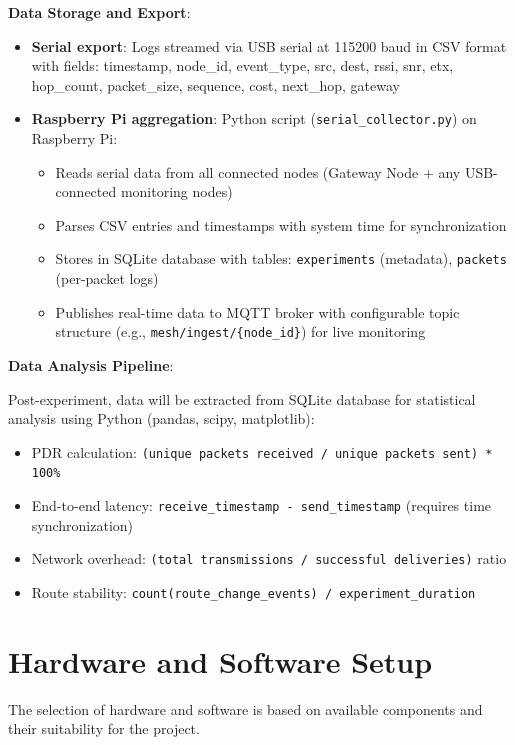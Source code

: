 \textbf{Data Storage and Export}:

\begin{itemize}
\item \textbf{Serial export}: Logs streamed via USB serial at 115200 baud in CSV format with fields: timestamp, node\_id, event\_type, src, dest, rssi, snr, etx, hop\_count, packet\_size, sequence, cost, next\_hop, gateway

\item \textbf{Raspberry Pi aggregation}: Python script (\texttt{serial\_collector.py}) on Raspberry Pi:
\begin{itemize}
\item Reads serial data from all connected nodes (Gateway Node + any USB-connected monitoring nodes)
\item Parses CSV entries and timestamps with system time for synchronization
\item Stores in SQLite database with tables: \texttt{experiments} (metadata), \texttt{packets} (per-packet logs)
\item Publishes real-time data to MQTT broker with configurable topic structure (e.g., \texttt{mesh/ingest/\{node\_id\}}) for live monitoring
\end{itemize}
\end{itemize}

\textbf{Data Analysis Pipeline}:

Post-experiment, data will be extracted from SQLite database for statistical analysis using Python (pandas, scipy, matplotlib):
\begin{itemize}
\item PDR calculation: \texttt{(unique packets received / unique packets sent) * 100\%}
\item End-to-end latency: \texttt{receive\_timestamp - send\_timestamp} (requires time synchronization)
\item Network overhead: \texttt{(total transmissions / successful deliveries)} ratio
\item Route stability: \texttt{count(route\_change\_events) / experiment\_duration}
\end{itemize}

\section{Hardware and Software Setup}

The selection of hardware and software is based on available components and their suitability for the project.

